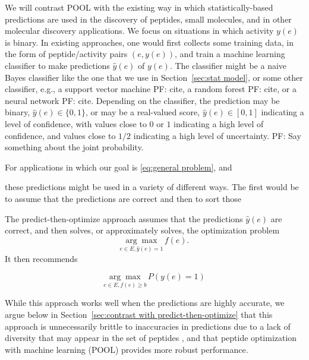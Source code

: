 \documentclass[11pt]{article}
\newcommand{\pfcomment}[1]{{\color{blue} PF: #1}}
\begin{document}
We will contrast POOL with the existing way in which statistically-based predictions are used in the discovery of peptides, small molecules, and in other molecular discovery applications.
We focus on situations in which activity $y(e)$ is binary. In existing approaches, one would first collects some training data, in the form of peptide/activity pairs $(e,y(e))$, and train a machine learning classifier to make predictions $\hat{y}(e)$ of $y(e)$.  The classifier might be a naive Bayes classifier like the one that we use in Section~\ref{sec:stat model}, or some other classifier, e.g., a support vector machine \pfcomment{cite}, a random forest \pfcomment{cite}, or a neural network\pfcomment{cite}.
Depending on the classifier, the prediction may be binary, $\hat{y}(e) \in \{0,1\}$, or may be a real-valued score, $\hat{y}(e) \in [0,1]$ indicating a level of confidence, with values close to $0$ or $1$ indicating a high level of confidence, and values close to $1/2$ indicating a high level of uncertainty.  \pfcomment{Say something about the joint probability.}

For applications in which our goal is \eqref{eq:general problem}, and 

these predictions might be used in a variety of different ways.  The first would be to assume that the predictions are correct and then to sort those 




The predict-then-optimize approach assumes that the predictions $\hat{y}(e)$ are correct, and then solves, or approximately solves, the optimization problem 
\begin{equation*}
  \underset{e \in E, \hat{y}(e) = 1}{\arg\max} \, f(e).
  \label{}
\end{equation*}
It then recommends 


\begin{equation*}
  \underset{e \in E, f(e) \ge b}{\arg\max} \, P(y(e)=1)
  \label{}
\end{equation*}


While this approach works well when the predictions are highly accurate, we argue below in Section~\ref{sec:contrast with predict-then-optimize} that this approach is unnecessarily brittle to inaccuracies in predictions due to a lack of diversity that may appear in the set of peptides , and that peptide optimization with machine learning (POOL) provides more robust performance.
\end{document}
